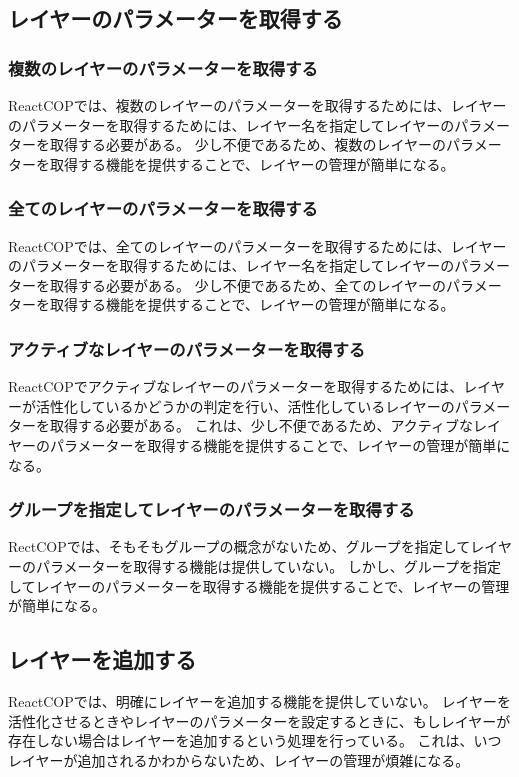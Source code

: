 \documentclass{jsarticle}
\begin{document}
\subsection{レイヤーのパラメーターを取得する}
\subsubsection{複数のレイヤーのパラメーターを取得する}
ReactCOPでは、複数のレイヤーのパラメーターを取得するためには、レイヤーのパラメーターを取得するためには、レイヤー名を指定してレイヤーのパラメーターを取得する必要がある。
少し不便であるため、複数のレイヤーのパラメーターを取得する機能を提供することで、レイヤーの管理が簡単になる。

\subsubsection{全てのレイヤーのパラメーターを取得する}
ReactCOPでは、全てのレイヤーのパラメーターを取得するためには、レイヤーのパラメーターを取得するためには、レイヤー名を指定してレイヤーのパラメーターを取得する必要がある。
少し不便であるため、全てのレイヤーのパラメーターを取得する機能を提供することで、レイヤーの管理が簡単になる。

\subsubsection{アクティブなレイヤーのパラメーターを取得する}
ReactCOPでアクティブなレイヤーのパラメーターを取得するためには、レイヤーが活性化しているかどうかの判定を行い、活性化しているレイヤーのパラメーターを取得する必要がある。
これは、少し不便であるため、アクティブなレイヤーのパラメーターを取得する機能を提供することで、レイヤーの管理が簡単になる。

\subsubsection{グループを指定してレイヤーのパラメーターを取得する}
RectCOPでは、そもそもグループの概念がないため、グループを指定してレイヤーのパラメーターを取得する機能は提供していない。
しかし、グループを指定してレイヤーのパラメーターを取得する機能を提供することで、レイヤーの管理が簡単になる。

\subsection{レイヤーを追加する}
ReactCOPでは、明確にレイヤーを追加する機能を提供していない。
レイヤーを活性化させるときやレイヤーのパラメーターを設定するときに、もしレイヤーが存在しない場合はレイヤーを追加するという処理を行っている。
これは、いつレイヤーが追加されるかわからないため、レイヤーの管理が煩雑になる。
\end{document}

